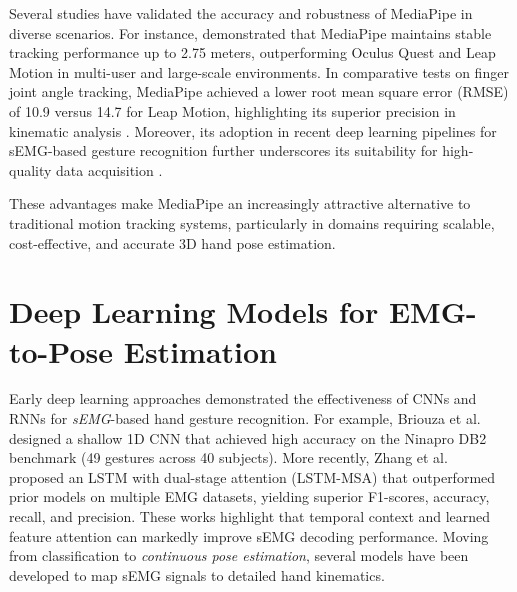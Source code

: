 Several studies have validated the accuracy and robustness of MediaPipe in diverse scenarios. For instance, \cite{reimer2023evaluation} demonstrated that MediaPipe maintains stable tracking performance up to 2.75 meters, outperforming Oculus Quest and Leap Motion in multi-user and large-scale environments. In comparative tests on finger joint angle tracking, MediaPipe achieved a lower root mean square error (RMSE) of 10.9\textdegree{} versus 14.7\textdegree{} for Leap Motion, highlighting its superior precision in kinematic analysis \cite{maggioni2025optimisation}. Moreover, its adoption in recent deep learning pipelines for sEMG-based gesture recognition further underscores its suitability for high-quality data acquisition \cite{lee2022explainable}.

These advantages make MediaPipe an increasingly attractive alternative to traditional motion tracking systems, particularly in domains requiring scalable, cost-effective, and accurate 3D hand pose estimation.

\section{Deep Learning Models for EMG-to-Pose Estimation}

Early deep learning approaches demonstrated the effectiveness of CNNs and RNNs for \textit{sEMG}-based hand gesture recognition. For example, Briouza et al.\ \cite{briouza2021convolutional} designed a shallow 1D CNN that achieved high accuracy on the Ninapro DB2 benchmark (49 gestures across 40 subjects). More recently, Zhang et al.\ \cite{zhang2023lstm} proposed an LSTM with dual-stage attention (LSTM-MSA) that outperformed prior models on multiple EMG datasets, yielding superior F1-scores, accuracy, recall, and precision. These works highlight that temporal context and learned feature attention can markedly improve sEMG decoding performance. Moving from classification to \textit{continuous pose estimation}, several models have been developed to map sEMG signals to detailed hand kinematics.

